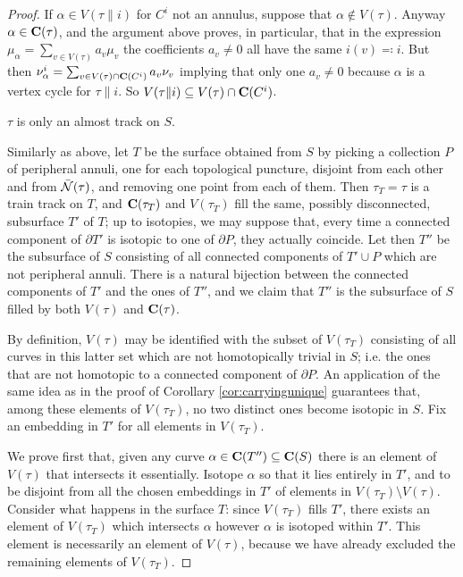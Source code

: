 \begin{proof}
If $\alpha\in V(\tau\|i)$ for $C^i$ not an annulus, suppose that $\alpha\not\in V(\tau)$. Anyway $\alpha\in\mathbf C(\tau)$, and the argument above proves, in particular, that in the expression $\mu_\alpha=\sum_{v\in V(\tau)} a_v\mu_v$ the coefficients $a_v\not=0$ all have the same $i(v)\eqqcolon i$. But then $\nu^i_\alpha=\sum_{v\in V(\tau)\cap \mathbf C(C^i)} a_v\nu_v$ implying that only one $a_v\not=0$ because $\alpha$ is a vertex cycle for $\tau\|i$. So $V(\tau\|i)\subseteq V(\tau)\cap \mathbf C(C^i)$.

 $\tau$ is only an almost track on $S$.

Similarly as above, let $T$ be the surface obtained from $S$ by picking a collection $P$ of peripheral annuli, one for each topological puncture, disjoint from each other and from $\bar{{\mathcal N}}(\tau)$, and removing one point from each of them. Then $\tau_T=\tau$ is a train track on $T$, and $\mathbf C(\tau_T)$ and $V(\tau_T)$ fill the same, possibly disconnected, subsurface $T'$ of $T$; up to isotopies, we may suppose that, every time a connected component of $\partial T'$ is isotopic to one of $\partial P$, they actually coincide. Let then $T''$ be the subsurface of $S$ consisting of all connected components of $T'\cup P$ which are not peripheral annuli. There is a natural bijection between the connected components of $T'$ and the ones of $T''$, and we claim that $T''$ is the subsurface of $S$ filled by both $V(\tau)$ and $\mathbf C(\tau)$.

By definition, $V(\tau)$ may be identified with the subset of $V(\tau_T)$ consisting of all curves in this latter set which are not homotopically trivial in $S$; i.e. the ones that are not homotopic to a connected component of $\partial P$. An application of the same idea as in the proof of Corollary \ref{cor:carryingunique} guarantees that, among these elements of $V(\tau_T)$, no two distinct ones become isotopic in $S$. Fix an embedding in $T'$ for all elements in $V(\tau_T)$.

We prove first that, given any curve $\alpha\in\mathbf C(T'')\subseteq \mathbf C(S)$ there is an element of $V(\tau)$ that intersects it essentially. Isotope $\alpha$ so that it lies entirely in $T'$, and to be disjoint from all the chosen embeddings in $T'$ of elements in $V(\tau_T)\setminus V(\tau)$. Consider what happens in the surface $T$: since $V(\tau_T)$ fills $T'$, there exists an element of $V(\tau_T)$ which intersects $\alpha$ however $\alpha$ is isotoped within $T'$. This element is necessarily an element of $V(\tau)$, because we have already excluded the remaining elements of $V(\tau_T)$.


\end{proof}
